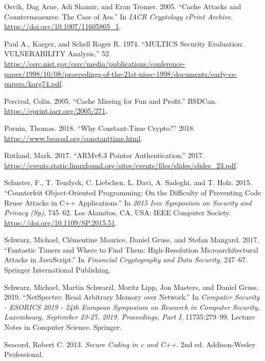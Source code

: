 \documentclass[a4paper,]{report}
\begin{document}
\leavevmode\hypertarget{ref-Osvik2005}{}%
Osvik, Dag Arne, Adi Shamir, and Eran Tromer. 2005. ``Cache Attacks and
Countermeasures: The Case of Aes.'' In \emph{IACR Cryptology ePrint
Archive}. \url{https://doi.org/10.1007/11605805_1}.

\leavevmode\hypertarget{ref-Karger1974}{}%
Paul A., Karger, and Schell Roger R. 1974. ``MULTICS Security
Evaluation: VULNERABILITY Analysis,'' 52.
\url{https://csrc.nist.gov/csrc/media/publications/conference-paper/1998/10/08/proceedings-of-the-21st-nissc-1998/documents/early-cs-papers/karg74.pdf}.

\leavevmode\hypertarget{ref-Percival2005}{}%
Percival, Colin. 2005. ``Cache Missing for Fun and Profit.'' BSDCan.
\url{https://eprint.iacr.org/2005/271}.

\leavevmode\hypertarget{ref-Pornin2018}{}%
Pornin, Thomas. 2018. ``Why Constant-Time Crypto?'' 2018.
\url{https://www.bearssl.org/constanttime.html}.

\leavevmode\hypertarget{ref-Rutland2017}{}%
Rutland, Mark. 2017. ``ARMv8.3 Pointer Authentication.'' 2017.
\url{https://events.static.linuxfound.org/sites/events/files/slides/slides_23.pdf}.

\leavevmode\hypertarget{ref-Schuster2015}{}%
Schuster, F., T. Tendyck, C. Liebchen, L. Davi, A. Sadeghi, and T. Holz.
2015. ``Counterfeit Object-Oriented Programming: On the Difficulty of
Preventing Code Reuse Attacks in C++ Applications.'' In \emph{2015 Ieee
Symposium on Security and Privacy (Sp)}, 745--62. Los Alamitos, CA, USA:
IEEE Computer Society. \url{https://doi.org/10.1109/SP.2015.51}.

\leavevmode\hypertarget{ref-Schwarz2017}{}%
Schwarz, Michael, Clémentine Maurice, Daniel Gruss, and Stefan Mangard.
2017. ``Fantastic Timers and Where to Find Them: High-Resolution
Microarchitectural Attacks in JavaScript.'' In \emph{Financial
Cryptography and Data Security}, 247--67. Springer International
Publishing.

\leavevmode\hypertarget{ref-Schwarz2019}{}%
Schwarz, Michael, Martin Schwarzl, Moritz Lipp, Jon Masters, and Daniel
Gruss. 2019. ``NetSpectre: Read Arbitrary Memory over Network.'' In
\emph{Computer Security - ESORICS 2019 - 24th European Symposium on
Research in Computer Security, Luxembourg, September 23-27, 2019,
Proceedings, Part I}, 11735:279--99. Lecture Notes in Computer Science.
Springer.

\leavevmode\hypertarget{ref-Seacord2013}{}%
Seacord, Robert C. 2013. \emph{Secure Coding in c and C++}. 2nd ed.
Addison-Wesley Professional.
\end{document}
